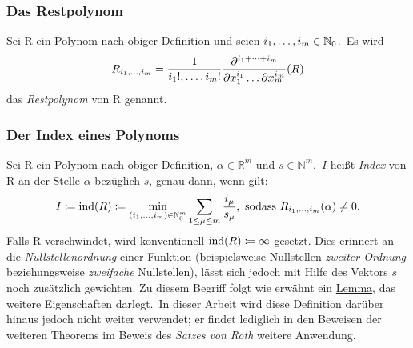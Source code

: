     \subsubsection{Das Restpolynom}
        \label{subsubsec:def-remainder-poly}
        Sei R ein Polynom nach \hyperref[subsubsec:def-poly]{obiger Definition} und seien $i_1, \dots, i_m \in
        \mathbb{N}_0$.\ Es wird
        \begin{equation}
            R_{i_1, \dots, i_m} = \frac{1}{i_1!, \dots, i_m!} \frac{\partial^{i_1 + \dots + i_m}}{
                \partial x_1^{i_1} \dots \partial x_m^{i_m}} (R) \label{eq:def-rempoly}
        \end{equation}
        das \emph{Restpolynom} von R genannt.
    
    \subsubsection{Der Index eines Polynoms}
        \label{subsubsec:def-index}
        \textrm{Sei R ein Polynom nach \hyperref[subsubsec:def-poly]{obiger Definition}, $\alpha \in \mathbb{R}^m$
            und $s \in \mathbb{N}^m$.\ $I$ heißt \emph{Index} von R an der Stelle $\alpha$ bezüglich $s$, genau dann,
            wenn gilt:}
        \begin{equation}
            I \coloneq \operatorname{ind}(R) \coloneq \min_{(i_1, \dots, i_m) \in \mathbb{N}_0^m} \sum_{1 \leq \mu \leq m} \frac{i_\mu}
            {s_\mu}, \ \textrm{sodass}\  R_{i_1, \dots, i_m}(\alpha) \neq 0. \label{eq:def-index}
        \end{equation}
        Falls R verschwindet, wird konventionell $\operatorname{ind}(R) \coloneq \infty$ gesetzt.
        \newline
        \textrm{Dies erinnert an die \emph{Nullstellenordnung} einer Funktion (beispielsweise Nullstellen
        \emph{zweiter Ordnung} beziehungsweise \emph{zweifache} Nullstellen), lässt sich jedoch mit Hilfe des
        Vektors $s$ noch zusätzlich gewichten.
        \newline
        Zu diesem Begriff folgt wie erwähnt ein \hyperref[subsec:lemma2]{Lemma}, das weitere Eigenschaften
        darlegt.\ In dieser Arbeit wird diese Definition darüber hinaus jedoch nicht weiter verwendet; er findet lediglich
        in den Beweisen der weiteren Theorems im Beweis des \emph{Satzes von Roth} weitere Anwendung.}
    
